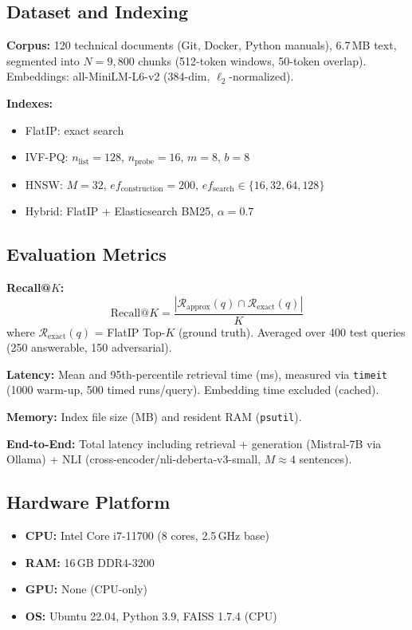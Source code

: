 \documentclass[conference]{IEEEtran}
\begin{document}
\subsection{Dataset and Indexing}

\textbf{Corpus:} 120 technical documents (Git, Docker, Python manuals), 6.7\,MB text, segmented into $N=9{,}800$ chunks (512-token windows, 50-token overlap). Embeddings: all-MiniLM-L6-v2 (384-dim, $\ell_2$-normalized).

\textbf{Indexes:}
\begin{itemize}
    \item FlatIP: exact search
    \item IVF-PQ: $n_{\text{list}}=128$, $n_{\text{probe}}=16$, $m=8$, $b=8$
    \item HNSW: $M=32$, $ef_{\text{construction}}=200$, $ef_{\text{search}} \in \{16,32,64,128\}$
    \item Hybrid: FlatIP + Elasticsearch BM25, $\alpha=0.7$
\end{itemize}

\subsection{Evaluation Metrics}

\textbf{Recall@$K$:}
\begin{equation}
\text{Recall@}K = \frac{|\mathcal{R}_{\text{approx}}(q) \cap \mathcal{R}_{\text{exact}}(q)|}{K}
\end{equation}
where $\mathcal{R}_{\text{exact}}(q)$ = FlatIP Top-$K$ (ground truth). Averaged over 400 test queries (250 answerable, 150 adversarial).

\textbf{Latency:} Mean and 95th-percentile retrieval time (ms), measured via \texttt{timeit} (1000 warm-up, 500 timed runs/query). Embedding time excluded (cached).

\textbf{Memory:} Index file size (MB) and resident RAM (\texttt{psutil}).

\textbf{End-to-End:} Total latency including retrieval + generation (Mistral-7B via Ollama) + NLI (cross-encoder/nli-deberta-v3-small, $M \approx 4$ sentences).

\subsection{Hardware Platform}

\begin{itemize}
    \item \textbf{CPU:} Intel Core i7-11700 (8 cores, 2.5\,GHz base)
    \item \textbf{RAM:} 16\,GB DDR4-3200
    \item \textbf{GPU:} None (CPU-only)
    \item \textbf{OS:} Ubuntu 22.04, Python 3.9, FAISS 1.7.4 (CPU)
\end{itemize}
\end{document}
